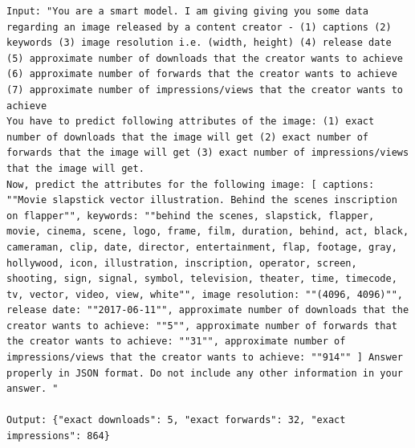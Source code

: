 \begin{lstlisting}[caption={Engagement Finetuning Verbalization Pattern (3): Noisy engagement in input and asking the model to correct engagement in output},frame=single,label={EngageNet:verbalization-3},basicstyle=\scriptsize]
Input: "You are a smart model. I am giving giving you some data regarding an image released by a content creator - (1) captions (2) keywords (3) image resolution i.e. (width, height) (4) release date (5) approximate number of downloads that the creator wants to achieve (6) approximate number of forwards that the creator wants to achieve (7) approximate number of impressions/views that the creator wants to achieve
You have to predict following attributes of the image: (1) exact number of downloads that the image will get (2) exact number of forwards that the image will get (3) exact number of impressions/views that the image will get.
Now, predict the attributes for the following image: [ captions: ""Movie slapstick vector illustration. Behind the scenes inscription on flapper"", keywords: ""behind the scenes, slapstick, flapper, movie, cinema, scene, logo, frame, film, duration, behind, act, black, cameraman, clip, date, director, entertainment, flap, footage, gray, hollywood, icon, illustration, inscription, operator, screen, shooting, sign, signal, symbol, television, theater, time, timecode, tv, vector, video, view, white"", image resolution: ""(4096, 4096)"", release date: ""2017-06-11"", approximate number of downloads that the creator wants to achieve: ""5"", approximate number of forwards that the creator wants to achieve: ""31"", approximate number of impressions/views that the creator wants to achieve: ""914"" ] Answer properly in JSON format. Do not include any other information in your answer. "

Output: {"exact downloads": 5, "exact forwards": 32, "exact impressions": 864}
\end{lstlisting}





